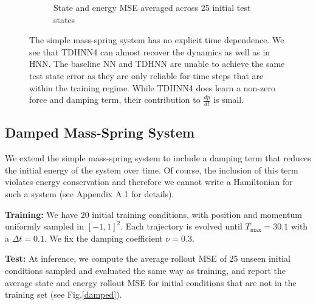 \documentclass{article}
\begin{document}
\begin{figure}[h!]
\begin{subfigure}[b]{0.48\textwidth}
		\caption{State and energy MSE averaged across 25 initial test states}
	\end{subfigure}
\caption{The simple mass-spring system has no explicit time dependence. We see that TDHNN4 can almost recover the dynamics as well as in HNN. The baseline NN and TDHNN are unable to achieve the same test state error as they are only reliable for time steps that are within the training regime. While TDHNN4 does learn a non-zero force and damping term, their contribution to $\frac{dp}{dt}$ is small.}
\label{mspring}
\end{figure}

\subsection{Damped Mass-Spring System}

We extend the simple mass-spring system to include a damping term that reduces the initial energy of the system over time. Of course, the inclusion of this term violates energy conservation and therefore we cannot write a Hamiltonian for such a system (see Appendix A.1 for details). 

\textbf{Training:} We have 20 initial training conditions, with position and momentum uniformly sampled in $[-1,1]^2$. Each trajectory is evolved until $T_{\max} = 30.1$ with a $\Delta t = 0.1$. We fix the damping coefficient $\nu = 0.3$.

\textbf{Test:} At inference, we compute the average rollout MSE of 25 unseen initial conditions sampled and evaluated the same way as training, and report the average state and energy rollout MSE for initial conditions that are not in the training set (see Fig.\ref{damped}).
\end{document}
